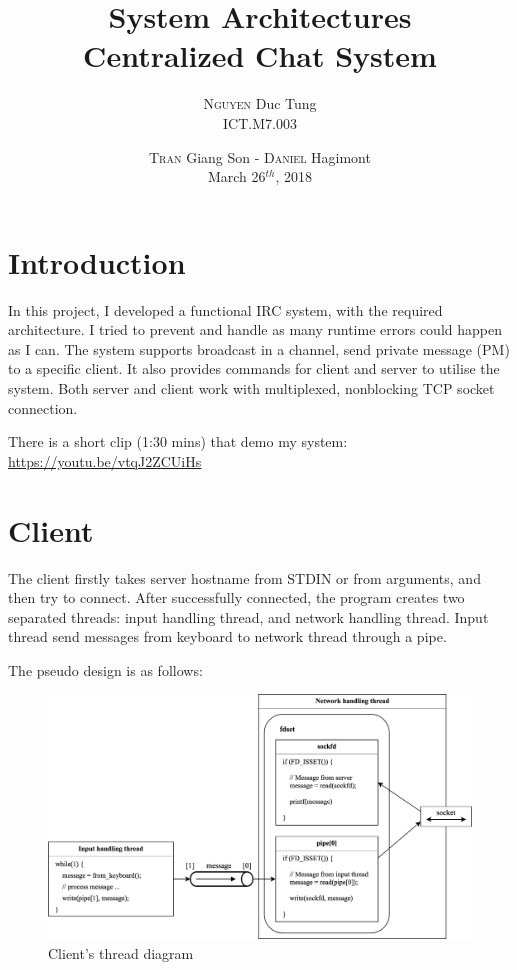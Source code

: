 \documentclass[12pt]{article}
\title{System Architectures \\ \bigskip Centralized Chat System}
\author{\textsc{Nguyen} Duc Tung \\ ICT.M7.003}
\date{\textsc{Tran} Giang Son - \textsc{Daniel} Hagimont \\ \medskip
March 26$^{th}$, 2018}
\begin{document}
\maketitle

\section{Introduction}

In this project, I developed a functional IRC system, with the required architecture. I tried to prevent and handle as many runtime errors could happen as I can. The system supports broadcast in a channel, send private message (PM) to a specific client. It also provides commands for client and server to utilise the system. Both server and client work with multiplexed, nonblocking TCP socket connection.

There is a short clip (1:30 mins) that demo my system: \url{https://youtu.be/vtqJ2ZCUiHs}

\section{Client}

The client firstly takes server hostname from STDIN or from arguments, and then try to connect. After successfully connected, the program creates two separated threads: input handling thread, and network handling thread. Input thread send messages from keyboard to network thread through a pipe.

The pseudo design is as follows:

\begin{figure}[H]
\centering
\includegraphics[width=\textwidth]{client_diagram.png}
\caption{Client's thread diagram}
\end{figure}
\end{document}
